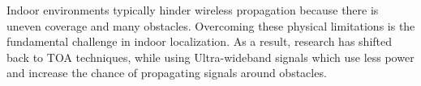 Indoor environments typically hinder wireless propagation because there is uneven coverage and many obstacles. Overcoming these physical limitations is the fundamental challenge in indoor localization. As a result, research has shifted back to TOA techniques, while using Ultra-wideband signals which use less power and increase the chance of propagating signals around obstacles.

%

